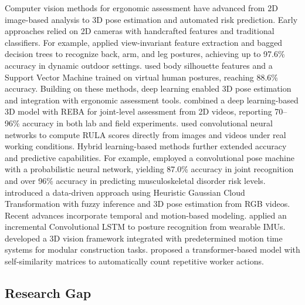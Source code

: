 \documentclass[11pt]{article}
\begin{document}
Computer vision methods for ergonomic assessment have advanced from 2D image-based analysis to 3D pose estimation and automated risk prediction. Early approaches relied on 2D cameras with handcrafted features and traditional classifiers. For example, \citet{yan2017development} applied view-invariant feature extraction and bagged decision trees to recognize back, arm, and leg postures, achieving up to 97.6\% accuracy in dynamic outdoor settings. \citet{seo2021automated} used body silhouette features and a Support Vector Machine trained on virtual human postures, reaching 88.6\% accuracy. Building on these methods, deep learning enabled 3D pose estimation and integration with ergonomic assessment tools. \citet{yu2019joint} combined a deep learning-based 3D model with REBA for joint-level assessment from 2D videos, reporting 70–96\% accuracy in both lab and field experiments. \citet{massirisfernandez2020ergonomic} used convolutional neural networks to compute RULA scores directly from images and videos under real working conditions. Hybrid learning-based methods further extended accuracy and predictive capabilities. For example, \citet{wang2021risk} employed a convolutional pose machine with a probabilistic neural network, yielding 87.0\% accuracy in joint recognition and over 96\% accuracy in predicting musculoskeletal disorder risk levels. \citet{li2024data} introduced a data-driven approach using Heuristic Gaussian Cloud Transformation with fuzzy inference and 3D pose estimation from RGB videos. Recent advances incorporate temporal and motion-based modeling. \citet{zhao2021applying} applied an incremental Convolutional LSTM to posture recognition from wearable IMUs. \citet{wang20233d} developed a 3D vision framework integrated with predetermined motion time systems for modular construction tasks. \citet{chen2024automatic} proposed a transformer-based model with self-similarity matrices to automatically count repetitive worker actions. 





\subsection{Research Gap}
\end{document}

